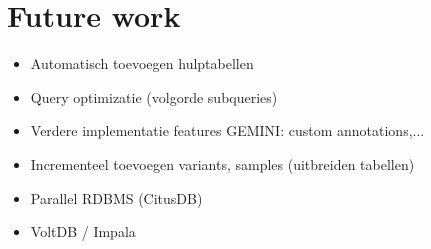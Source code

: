 \chapter{Future work}

\begin{itemize}
\item Automatisch toevoegen hulptabellen
\item Query optimizatie (volgorde subqueries)
\item Verdere implementatie features GEMINI: custom annotations,...
\item Incrementeel toevoegen variants, samples (uitbreiden tabellen)
\item Parallel RDBMS (CitusDB)
\item VoltDB / Impala
\end{itemize}